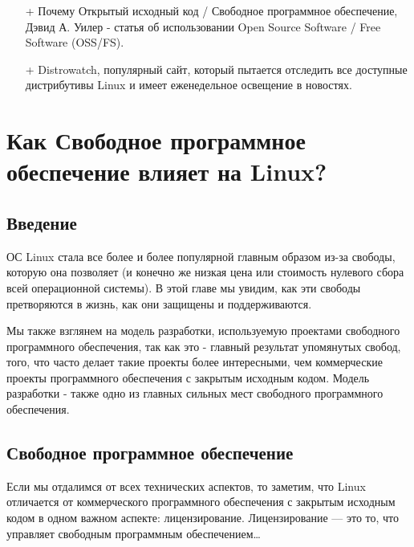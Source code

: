 \documentclass[12pt]{book}
\begin{document}
\phantom{}
\begin{tcolorbox}[title=\textbf{Дальнейшие ресурсы}, colback=yellow!14!white, colframe=red!75!blue]
\begin{itemize}
	\item[+] Почему Открытый исходный код / Свободное программное обеспечение, Дэвид А. Уилер - статья об использовании Open Source Software / Free Software (OSS/FS).
	\item[+] Distrowatch, популярный сайт, который пытается отследить все доступные дистрибутивы Linux и имеет еженедельное освещение в новостях.
\end{itemize}
\end{tcolorbox}

\newpage


\chapter{Как Свободное программное обеспечение влияет на Linux?}

\section*{Введение}

ОС Linux стала все более и более популярной главным образом из-за свободы, которую она позволяет (и конечно же низкая цена или стоимость нулевого сбора всей операционной системы). В этой главе мы увидим, как эти свободы претворяются в жизнь, как они защищены и поддерживаются.

Мы также взглянем на модель разработки, используемую проектами свободного программного обеспечения, так как это - главный результат упомянутых свобод, того, что часто делает такие проекты более интересными, чем коммерческие проекты программного обеспечения с закрытым исходным кодом. Модель разработки - также одно из главных сильных мест свободного программного обеспечения.

\section{Свободное программное обеспечение}

Если мы отдалимся от всех технических аспектов, то заметим, что Linux отличается от коммерческого программного обеспечения с закрытым исходным кодом в одном важном аспекте: лицензирование. Лицензирование --- это то, что управляет свободным программным обеспечением\ldots
\end{document}
